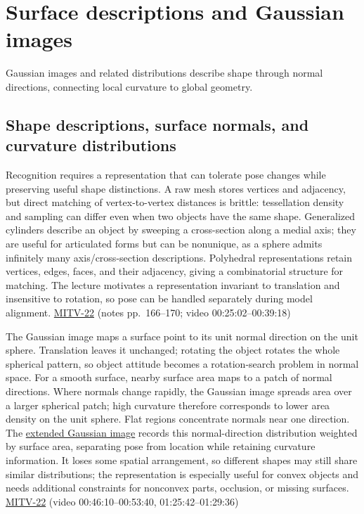 \section{Surface descriptions and Gaussian images}\label{04-visual-computing-ii-ch032-surface-descriptions-and-gaussian-images}

Gaussian images and related distributions describe shape through normal directions, connecting local curvature to global geometry.

\subsection{Shape descriptions, surface normals, and curvature distributions}\label{04-visual-computing-ii-ch032-shape-descriptions-surface-normals-and-curvature-distributions}

Recognition requires a representation that can tolerate pose changes while preserving useful shape distinctions. A raw mesh stores vertices and adjacency, but direct matching of vertex-to-vertex distances is brittle: tessellation density and sampling can differ even when two objects have the same shape. Generalized cylinders describe an object by sweeping a cross-section along a medial axis; they are useful for articulated forms but can be nonunique, as a sphere admits infinitely many axis/cross-section descriptions. Polyhedral representations retain vertices, edges, faces, and their adjacency, giving a combinatorial structure for matching. The lecture motivates a representation invariant to translation and insensitive to rotation, so pose can be handled separately during model alignment. \hyperref[04-visual-computing-ii-ch036-mitv-22---exterior-orientation-recovering-position-orientation-bundle-adjustment-object-shape]{MITV-22} (notes pp.~166--170; video 00:25:02--00:39:18)

The Gaussian image maps a surface point to its unit normal direction on the unit sphere. Translation leaves it unchanged; rotating the object rotates the whole spherical pattern, so object attitude becomes a rotation-search problem in normal space. For a smooth surface, nearby surface area maps to a patch of normal directions. Where normals change rapidly, the Gaussian image spreads area over a larger spherical patch; high curvature therefore corresponds to lower area density on the unit sphere. Flat regions concentrate normals near one direction. The \hyperref[appendix-89b2d5b7c9e1]{extended Gaussian image} records this normal-direction distribution weighted by surface area, separating pose from location while retaining curvature information. It loses some spatial arrangement, so different shapes may still share similar distributions; the representation is especially useful for convex objects and needs additional constraints for nonconvex parts, occlusion, or missing surfaces. \hyperref[04-visual-computing-ii-ch036-mitv-22---exterior-orientation-recovering-position-orientation-bundle-adjustment-object-shape]{MITV-22} (video 00:46:10--00:53:40, 01:25:42--01:29:36)

